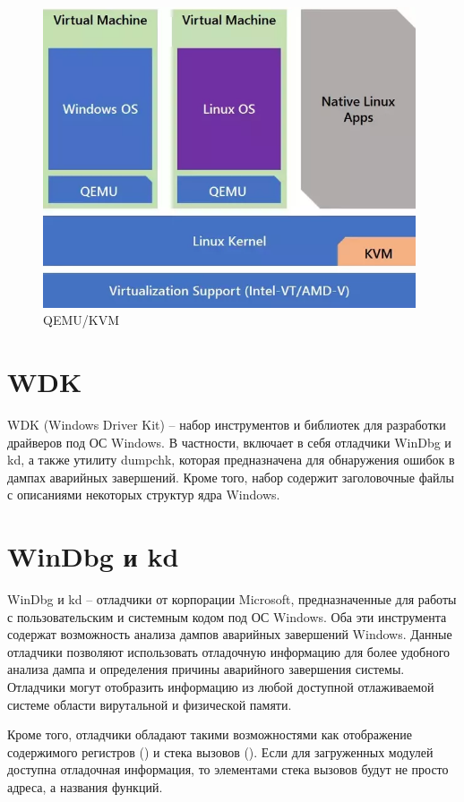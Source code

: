 \documentclass{mipt-thesis-bs}
\begin{document}
\begin{figure}[h]
\begin{center}
    \includegraphics[width=11cm]{qemukvm.png}
    \caption{QEMU/KVM}
    \label{fig:qemukvm}
\end{center}
\end{figure}

\newpage
\section*{WDK}

WDK (Windows Driver Kit) -- набор инструментов и библиотек для разработки драйверов под ОС Windows. В частности, включает в себя отладчики WinDbg и kd, а также утилиту dumpchk, которая предназначена для обнаружения ошибок в дампах аварийных завершений. Кроме того, набор содержит заголовочные файлы с описаниями некоторых структур ядра Windows.

\section*{WinDbg и kd}

WinDbg и kd -- отладчики от корпорации Microsoft, предназначенные для работы с пользовательским и системным кодом под ОС Windows. Оба эти инструмента содержат возможность анализа дампов аварийных завершений Windows. Данные отладчики позволяют использовать отладочную информацию для более удобного анализа дампа и определения причины аварийного завершения системы. Отладчики могут отобразить информацию из любой доступной отлаживаемой системе области вирутальной и физической памяти.

\newpage
Кроме того, отладчики обладают такими возможностями как отображение содержимого регистров () и стека вызовов (). Если для загруженных модулей доступна отладочная информация, то элементами стека вызовов будут не просто адреса, а названия функций.
\end{document}
